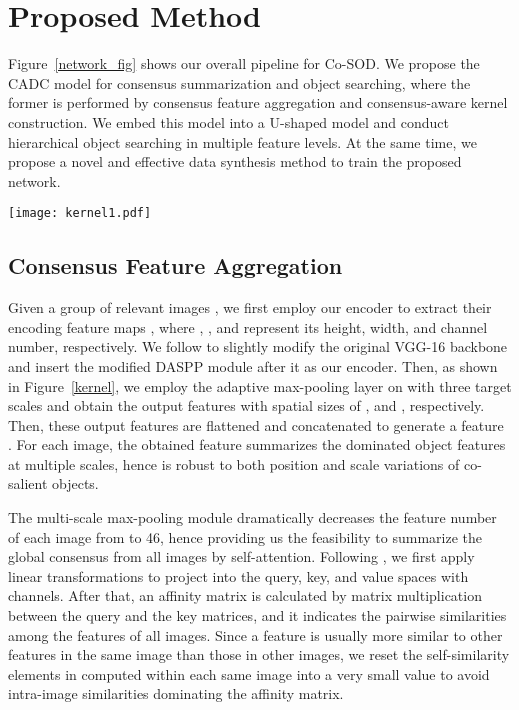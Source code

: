 \documentclass[10pt,twocolumn,letterpaper]{article}
\begin{document}
\section{Proposed Method}
Figure~\ref{network_fig} shows our overall pipeline for Co-SOD. We propose the CADC model for consensus summarization and object searching, where the former is performed by consensus feature aggregation and consensus-aware kernel construction. We embed this model into a U-shaped \cite{ronneberger2015unet} model and conduct hierarchical object searching in multiple feature levels.
At the same time, we propose a novel and effective data synthesis method to train the proposed network.

\begin{figure*}[!t]
  \graphicspath{{Figures/dynamic_kernel/}}
  \centering
  \texttt{[image: kernel1.pdf]}
  \caption{Pipeline of our proposed CADC for consensus summarization and object searching. We generate two types of kernels, \ie, adaptive kernel, and common kernel, for each image and the whole group, respectively. `SA' means the self-attention module.  and   mean the depthwise separable convolution and concatenation, respectively.}
  \label{kernel}
  \vspace{-0.3cm}
\end{figure*}

\subsection{Consensus Feature Aggregation}

Given a group of  relevant images , we first employ our encoder to extract their encoding feature maps , where , , and  represent its height, width, and channel number, respectively.
We follow \cite{liu2020S2MA} to slightly modify the original VGG-16 \cite{simonyan2014vgg} backbone and insert the modified DASPP module \cite{yang2018denseaspp} after it as our encoder.
Then, as shown in Figure~\ref{kernel}, we employ the adaptive max-pooling layer on  with three target scales and obtain the output features with spatial sizes of ,  and , respectively. Then, these output features are flattened and concatenated to generate a feature . For each image, the obtained feature summarizes the dominated object features at multiple scales, hence is robust to both position and scale variations of co-salient objects.

The multi-scale max-pooling module dramatically decreases the feature number of each image from  to 46, hence providing us the feasibility to summarize the global consensus from all images by self-attention.
Following \cite{vaswani2017attention}, we first apply linear transformations to project  into the query, key, and value spaces with  channels. After that, an affinity matrix  is calculated by matrix multiplication
between the query and the key matrices,
and it indicates the pairwise similarities among the  features of all images. Since a feature is usually more similar to other features in the same image than those in other images, we reset the self-similarity elements in  computed within each same image into a very small value to avoid intra-image similarities dominating the affinity matrix.
\end{document}
